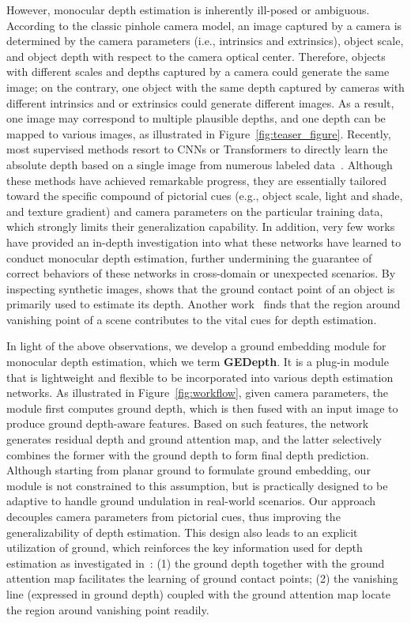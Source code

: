 \documentclass[10pt,twocolumn,letterpaper]{article}
\begin{document}
However, monocular depth estimation is inherently ill-posed or ambiguous. 
According to the classic pinhole camera model, an image captured by a camera is determined by the camera parameters (i.e., intrinsics and extrinsics), object scale, and object depth with respect to the camera optical center. Therefore, objects with different scales and depths captured by a camera could generate the same image; on the contrary, one object with the same depth captured by cameras with different intrinsics and or extrinsics could generate different images. As a result, one image may correspond to multiple plausible depths, and one depth can be mapped to various images, as illustrated in Figure~\ref{fig:teaser_figure}. Recently, most supervised methods resort to CNNs or Transformers to directly learn the absolute depth based on a single image from numerous labeled data~\cite{bhat2021adabins, fu2018deep, lee2019big, li2022depthformer, yuan2022new}. Although these methods have achieved remarkable progress, they are essentially tailored toward the specific compound of pictorial cues (e.g., object scale, light and shade, and texture gradient) and camera parameters on the particular training data, which strongly limits their generalization capability. In addition, very few works have provided an in-depth investigation into what these networks have learned to conduct monocular depth estimation, further undermining the guarantee of correct behaviors of these networks in cross-domain or unexpected scenarios. By inspecting synthetic images, \cite{dijk2019neural} shows that the ground contact point of an object is primarily used to estimate its depth. Another work~\cite{hu2019visualization} finds that the region around vanishing point of a scene contributes to the vital cues for depth estimation. 

In light of the above observations, we develop a ground embedding module for monocular depth estimation, which we term \textbf{GEDepth}. It is a plug-in module that is lightweight and flexible to be incorporated into various depth estimation networks. As illustrated in Figure~\ref{fig:workflow}, given camera parameters, the module first computes ground depth, which is then fused with an input image to produce ground depth-aware features. Based on such features, the network generates residual depth and ground attention map, and the latter selectively combines the former with the ground depth to form final depth prediction. Although starting from planar ground to formulate ground embedding, our module is not constrained to this assumption, but is practically designed to be adaptive to handle ground undulation in real-world scenarios. Our approach decouples camera parameters from pictorial cues, thus improving the generalizability of depth estimation. This design also leads to an explicit utilization of ground, which reinforces the key information used for depth estimation as investigated in~\cite{dijk2019neural,hu2019visualization}: (1) the ground depth together with the ground attention map facilitates the learning of ground contact points; (2) the vanishing line (expressed in ground depth) coupled with the ground attention map locate the region around vanishing point readily. 
\end{document}
